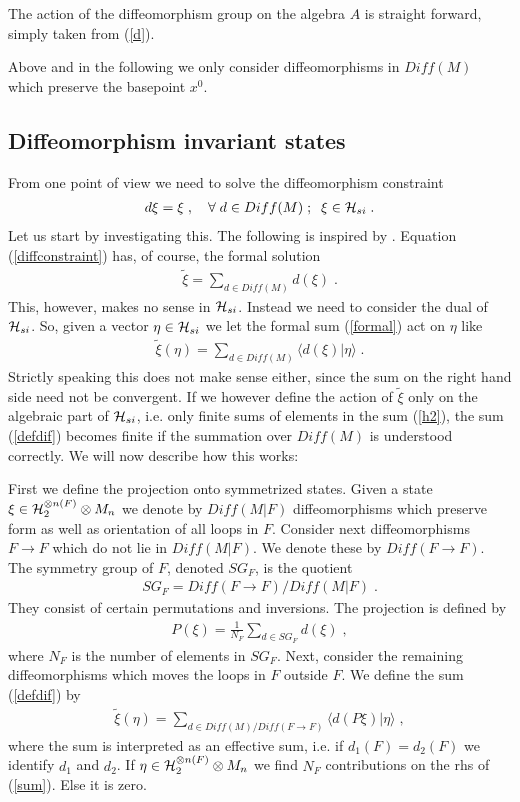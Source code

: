 \documentclass[12pt]{article}
\newcommand{\ba}{\begin{eqnarray}}
\newcommand{\ea}{\end{eqnarray}}
\def\ch{{\cal H}}
\begin{document}
The action of the diffeomorphism group on the algebra $A$ is straight forward,
simply taken from (\ref{d}).

Above and in the following we only consider diffeomorphisms in $Diff(M)$ which
preserve the basepoint $x^{0}$.


\subsection{Diffeomorphism invariant states}
\label{sec-diff1}




From one point of view we need to solve the diffeomorphism constraint
\ba
d \xi = \xi\;,\quad \forall\; d\in Diff(M)\;;\;\;\xi\in\ch_{si}\;.
\label{diffconstraint}
\ea
Let us start by investigating this. The following is inspired by \cite{Ashtekar:2004eh,Ashtekar:1995zh}. Equation
(\ref{diffconstraint}) has, of course, the formal solution 
\ba \label{formal}
\tilde{\xi}=\sum_{d\in Diff(M)} d(\xi)\;.
\ea
This, however, makes no sense in $\ch_{si}$. Instead we need to consider the
dual of $\ch_{si}$. So, given a vector $\eta \in \ch_{si}$ we let the formal sum
(\ref{formal}) act on $\eta$ like
\ba \label{defdif}
\tilde{\xi} ( \eta)=\sum_{d \in Diff(M)} \langle d(\xi)| \eta \rangle\;.
\ea
Strictly speaking this does not make sense either, since the sum on the right
hand side need not be convergent. If we however define the action of
$\tilde{\xi}$ only on the algebraic part of $\ch_{si}$, i.e. only finite sums
of elements in the sum (\ref{h2}), the sum (\ref{defdif}) becomes finite if
the summation over $Diff (M)$ is understood correctly. We will now describe how this works: 

First we define the projection onto symmetrized states. Given a state
$\xi\in\ch_2^{\otimes n(F)}\otimes M_n$ we denote by $Diff(M|F)$
diffeomorphisms which preserve form as well as orientation of all loops in
$F$. Consider next diffeomorphisms $F\to F$ which do not lie in
$Diff(M|F)$. We denote these by $Diff(F\to F)$. The symmetry group of $F$, denoted
$SG_F$, is the quotient 
\ba
SG_F = Diff(F\to F)/Diff(M|F)\;.
\label{SG}
\ea
They consist of certain permutations and inversions. The projection is
defined by
\ba
P(\xi) = \frac{1}{N_F}\sum_{d \in SG_F} d( \xi )\;,
\label{projection}
\ea
where $N_F$ is the number of elements in $SG_F$. Next, consider the remaining
diffeomorphisms which moves the loops in $F$ outside $F$. We define the sum
(\ref{defdif}) by
\ba
\label{sum}
\tilde{\xi} ( \eta)=\sum_{d \in Diff(M)/Diff(F\to F)} \langle d ( P\xi)| \eta \rangle\;,
\ea
where the sum is interpreted as an effective sum, i.e. if $d_1(F)=d_2(F)$ we
identify $d_1$ and $d_2$. 
If $\eta\in \ch_{2}^{\otimes n(F)}\otimes M_n$ we find $N_F$ contributions on
the rhs of
(\ref{sum}). Else it is zero.
\end{document}
